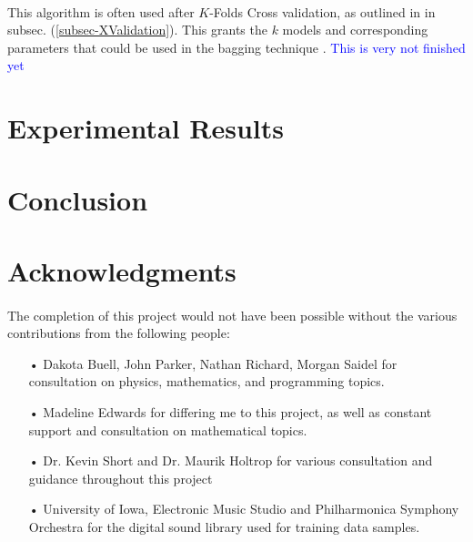 \documentclass[12pt,letterpaper]{article}
\begin{document}
\paragraph*{}This algorithm is often used after $K$-Folds Cross validation, as outlined in in subsec. (\ref{subsec-XValidation}). This grants the $k$ models and corresponding parameters that could be used in the bagging technique \cite{James}. \textcolor{blue}{This is very not finished yet}


\newpage
\section{Experimental Results}
\label{sec-Results}



\newpage
\section{Conclusion}
\label{sec-Conclusion}



\newpage
\section{Acknowledgments}
\label{sec-Acknowledge}

\paragraph*{}The completion of this project would not have been possible without the various contributions from the following people:

\begin{itemize}

\item[•]Dakota Buell, John Parker, Nathan Richard, Morgan Saidel for consultation on physics, mathematics, and programming topics.

\item[•]Madeline Edwards for differing me to this project, as well as constant support and consultation on mathematical topics.

\item[•]Dr. Kevin Short and Dr. Maurik Holtrop for various consultation and guidance throughout this project

\item[•]University of Iowa, Electronic Music Studio and Philharmonica Symphony Orchestra for the digital sound library used for training data samples.

\end{itemize}
\end{document}
